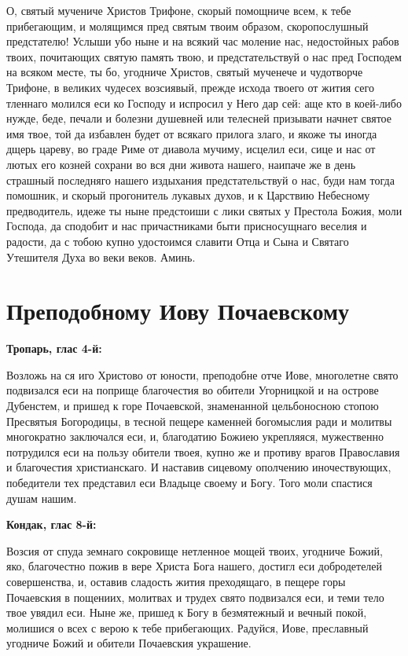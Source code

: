 О, святый мучениче Христов Трифоне, скорый помощниче всем, к тебе прибегающим, и молящимся пред святым твоим образом, скоропослушный предстателю! Услыши убо ныне и на всякий час моление нас, недостойных рабов твоих, почитающих святую память твою, и предстательствуй о нас пред Господем на всяком месте, ты бо, угодниче Христов, святый мученече и чудотворче Трифоне, в великих чудесех возсиявый, прежде исхода твоего от жития сего тленнаго молился еси ко Господу и испросил у Него дар сей: аще кто в коей-либо нужде, беде, печали и болезни душевней или телесней призывати начнет святое имя твое, той да избавлен будет от всякаго прилога злаго, и якоже ты иногда дщерь цареву, во граде Риме от диавола мучиму, исцелил еси, сице и нас от лютых его козней сохрани во вся дни живота нашего, наипаче же в день страшный последняго нашего издыхания предстательствуй о нас, буди нам тогда помошник, и скорый прогонитель лукавых духов, и к Царствию Небесному предводитель, идеже ты ныне предстоиши с лики святых у Престола Божия, моли Господа, да сподобит и нас причастниками быти присносущнаго веселия и радости, да с тобою купно удостоимся славити Отца и Сына и Святаго Утешителя Духа во веки веков. Аминь.


\section{Преподобному Иову Почаевскому}
 


\bfseries Тропарь, глас 4-й:\normalfont{}\nopagebreak


Возложь на ся иго Христово от юности, преподобне отче Иове, многолетне свято подвизался еси на поприще благочестия во обители Угорницкой и на острове Дубенстем, и пришед к горе Почаевской, знаменанной цельбоносною стопою Пресвятыя Богородицы, в тесной пещере каменней богомыслия ради и молитвы многократно заключался еси, и, благодатию Божиею укрепляяся, мужественно потрудился еси на пользу обители твоея, купно же и противу врагов Православия и благочестия христианскаго. И наставив сицевому ополчению иночествующих, победители тех представил еси Владыце своему и Богу. Того моли спастися душам нашим.


\medskip


\bfseries Кондак, глас 8-й:\normalfont{}\nopagebreak


Возсия от спуда земнаго сокровище нетленное мощей твоих, угодниче Божий, яко, благочестно пожив в вере Христа Бога нашего, достигл еси добродетелей совершенства, и, оставив сладость жития преходящаго, в пещере горы Почаевския в пощениих, молитвах и трудех свято подвизался еси, и теми тело твое увядил еси. Ныне же, пришед к Богу в безмятежный и вечный покой, молишися о всех с верою к тебе прибегающих. Радуйся, Иове, преславный угодниче Божий и обители Почаевския украшение.


